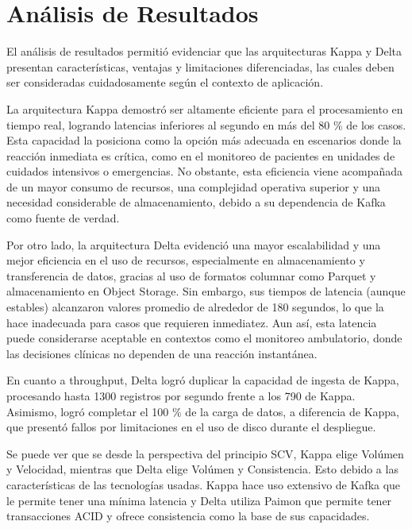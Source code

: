 \section{Análisis de Resultados}

El análisis de resultados permitió evidenciar que las arquitecturas Kappa y Delta presentan características, 
ventajas y limitaciones diferenciadas, las cuales deben ser consideradas cuidadosamente según el contexto de aplicación. \newline

La arquitectura Kappa demostró ser altamente eficiente para el procesamiento en tiempo real, logrando latencias inferiores al segundo en más del 80 \% de los casos. 
Esta capacidad la posiciona como la opción más adecuada en escenarios donde la reacción inmediata es crítica, 
como en el monitoreo de pacientes en unidades de cuidados intensivos o emergencias. 
No obstante, esta eficiencia viene acompañada de un mayor consumo de recursos, 
una complejidad operativa superior y una necesidad considerable de almacenamiento, 
debido a su dependencia de Kafka como fuente de verdad. \newline

Por otro lado, la arquitectura Delta evidenció una mayor escalabilidad y una mejor eficiencia en el uso de recursos, 
especialmente en almacenamiento y transferencia de datos, gracias al uso de formatos columnar como Parquet y almacenamiento en Object Storage. 
Sin embargo, sus tiempos de latencia (aunque estables) alcanzaron valores promedio de alrededor de 180 segundos, 
lo que la hace inadecuada para casos que requieren inmediatez. Aun así, esta latencia puede considerarse aceptable en contextos como el monitoreo ambulatorio, 
donde las decisiones clínicas no dependen de una reacción instantánea. \newline

En cuanto a throughput, Delta logró duplicar la capacidad de ingesta de Kappa, 
procesando hasta 1300 registros por segundo frente a los 790 de Kappa. 
Asimismo, logró completar el 100 \% de la carga de datos, a diferencia de Kappa, 
que presentó fallos por limitaciones en el uso de disco durante el despliegue. \newline

Se puede ver que se desde la perspectiva del principio SCV, Kappa elige Volúmen y Velocidad,
mientras que Delta elige Volúmen y Consistencia. Esto debido a las características de las tecnologías usadas. 
Kappa hace uso extensivo de Kafka que le permite tener una mínima latencia 
y Delta utiliza Paimon que permite tener transacciones ACID y ofrece consistencia como la base de sus capacidades.

